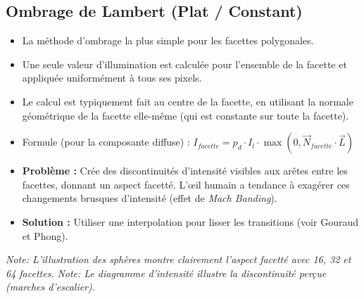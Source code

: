 \documentclass{article}
\begin{document}
\subsection{Ombrage de Lambert (Plat / Constant)}
\begin{itemize}
    \item La méthode d'ombrage la plus simple pour les facettes polygonales.
    \item Une seule valeur d'illumination est calculée pour l'ensemble de la facette et appliquée uniformément à tous ses pixels.
    \item Le calcul est typiquement fait au centre de la facette, en utilisant la normale géométrique de la facette elle-même (qui est constante sur toute la facette).
    \item Formule (pour la composante diffuse) : $I_{facette} = p_d \cdot I_l \cdot \max(0, \vec{N}_{facette} \cdot \vec{L})$
    \item \textbf{Problème :} Crée des discontinuités d'intensité visibles aux arêtes entre les facettes, donnant un aspect facetté. L'œil humain a tendance à exagérer ces changements brusques d'intensité (effet de \textit{Mach Banding}).
    \item \textbf{Solution :} Utiliser une interpolation pour lisser les transitions (voir Gouraud et Phong).
\end{itemize}

\textit{Note: L'illustration des sphères montre clairement l'aspect facetté avec 16, 32 et 64 facettes.}
\textit{Note: Le diagramme d'intensité illustre la discontinuité perçue (marches d'escalier).}
\end{document}
